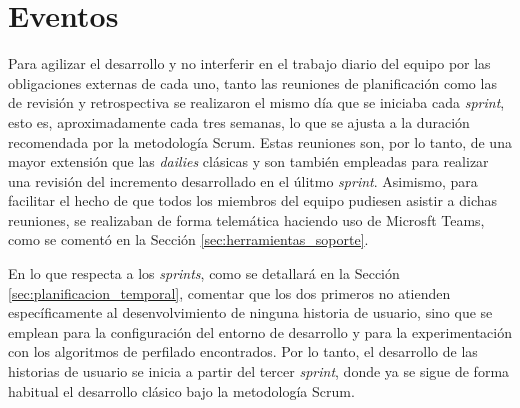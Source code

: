 \section{Eventos}
\label{sec:metodologia_eventos}

Para agilizar el desarrollo y no interferir en el trabajo diario del equipo por las obligaciones
externas de cada uno, tanto las reuniones de planificación como las de revisión y retrospectiva se realizaron
el mismo día que se iniciaba cada \textit{sprint}, esto es, aproximadamente cada tres semanas, lo que se ajusta a la duración recomendada
por la metodología Scrum. Estas reuniones son, por lo tanto, de una mayor extensión que las \textit{dailies} clásicas y son también empleadas
para realizar una revisión del incremento desarrollado en el úlitmo \textit{sprint}. Asimismo, para facilitar el hecho de que todos los miembros
del equipo pudiesen asistir a dichas reuniones, se realizaban de forma telemática haciendo uso de Microsft Teams, como se comentó en la Sección \ref{sec:herramientas_soporte}.

\bigskip
En lo que respecta a los \textit{sprints}, como se detallará en la Sección \ref{sec:planificacion_temporal}, comentar que los dos primeros
no atienden específicamente al desenvolvimiento de ninguna historia de usuario, sino que se emplean para la configuración del entorno de desarrollo
y para la experimentación con los algoritmos de perfilado encontrados. Por lo tanto, el desarrollo de las historias de usuario se inicia
a partir del tercer \textit{sprint}, donde ya se sigue de forma habitual el desarrollo clásico bajo la metodología Scrum.
